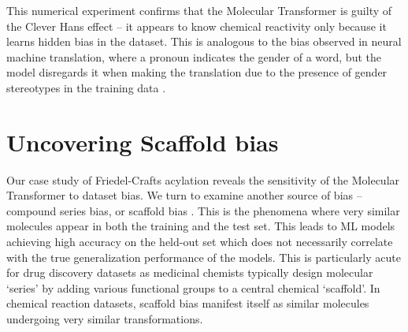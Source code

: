 This numerical experiment confirms that the Molecular Transformer is guilty of the Clever Hans effect -- it appears to know chemical reactivity only because it learns hidden bias in the dataset. This is analogous to the bias observed in neural machine translation, where a pronoun indicates the gender of a word, but the model disregards it when making the translation due to the presence of gender stereotypes in the training data \cite{Stanovsky2019GenderBias}.

\section{Uncovering Scaffold bias}

Our case study of Friedel-Crafts acylation reveals the sensitivity of the Molecular Transformer to dataset bias. We turn to examine another source of bias -- compound series bias, or scaffold bias \cite{Mayr2018compare}. This is the phenomena where very similar molecules appear in both the training and the test set. This leads to ML models achieving high accuracy on the held-out set which does not necessarily correlate with the true generalization performance of the models. This is particularly acute for drug discovery datasets as medicinal chemists typically design molecular `series' by adding various functional groups to a central chemical `scaffold'. In chemical reaction datasets, scaffold bias manifest itself as similar molecules undergoing very similar transformations.

